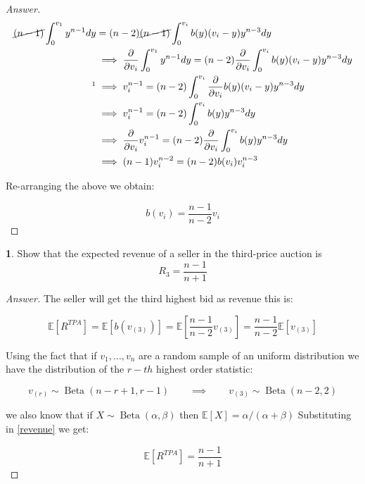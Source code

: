 \documentclass[12pt]{article}
\theoremstyle{definition}
\newtheorem{subproblem}{}[problem]
\newcommand{\qiq}{\qquad \implies \qquad}
\begin{document}
\begin{proof}[Answer]
\begin{align*}
    \cancel{(n-1)}\int_{0}^{v_1}y^{n-1}dy &= (n-2)\cancel{(n-1)}\int_{0}^{v_i}{b(y)(v_i-y)y^{n-3}}dy    \\
    &\implies \frac{\partial }{\partial v_i} \int_{0}^{v_1}y^{n-1}dy = (n-2)\frac{\partial }{\partial v_i} \int_{0}^{v_i}{b(y)(v_i-y)y^{n-3}}dy   \\
    \footnotemark&\implies v_i^{n-1} = (n-2) \int_{0}^{v_i}{\frac{\partial }{\partial v_i}b(y)(v_i-y)y^{n-3}}dy   \\
    &\implies v_i^{n-1} = (n-2) \int_{0}^{v_i}b(y)y^{n-3}dy\\
    &\implies \frac{\partial}{\partial v_i}v_i^{n-1} = (n-2)\frac{\partial }{\partial v_i}\int_{0}^{v_i}b(y)y^{n-3}dy\\
    &\implies (n-1)v_i^{n-2} = (n-2)b(v_i)v_i^{n-3}
\end{align*}

Re-arranging the above we obtain:

$$\boxed{b(v_i) = \frac{n-1}{n-2}v_i}$$

\end{proof}

\begin{subproblem}
 Show that the expected revenue of a seller in the third-price auction is
$$
R_{3}=\frac{n-1}{n+1}
$$
\end{subproblem}

\begin{proof}[Answer]
The seller will get the third highest bid as revenue this is:

\begin{equation}\label{revenue}
\mathbb{E}[R^{TPA}] = \mathbb{E}[b(v_{(3)})] = \mathbb{E}\left[ \frac{n-1}{n-2}v_{(3)}\right] =  \frac{n-1}{n-2}\mathbb{E}[v_{(3)}]
\end{equation}

Using the fact that if $v_1,\ldots,v_n$ are a random sample of an uniform distribution we have the distribution of the $r-th$ highest order statistic:

$$v_{(r)}\sim \operatorname{Beta}(n-r+1,r-1) \qiq v_{(3)}\sim \operatorname{Beta}(n-2,2)$$

we also know that if $X\sim \operatorname{Beta}(\alpha,\beta)$ then $\mathbb{E}[X]=\alpha/(\alpha+\beta)$
Substituting in \eqref{revenue} we get:

$$\boxed{\mathbb{E}[R^{TPA}] = \frac{n-1}{n+1}}$$


\end{proof}
\end{document}
